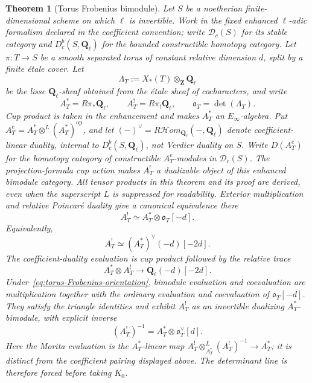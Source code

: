 \documentclass[11pt]{article}
\newtheorem{theorem}{Theorem}[section]
\theoremstyle{definition}
\theoremstyle{remark}
\newcommand{\Qell}{\mathbf Q_\ell}
\begin{document}
\begin{theorem}[Torus Frobenius bimodule]
\label{thm:torus-Frobenius-bimodule}
Let $S$ be a noetherian finite-dimensional scheme on which $\ell$ is
invertible.  Work in the fixed enhanced $\ell$-adic formalism declared in the
coefficient convention; write $\mathscr D_c(S)$ for its stable category and
$D_c^b(S,\Qell)$ for the bounded constructible homotopy category.  Let
$\pi:T\to S$ be a
smooth separated torus of constant relative dimension $d$, split by a finite
\'etale cover.  Let
\[
 \Lambda_T:=X_*(T)\otimes_{\mathbf Z}\Qell
\]
be the lisse $\Qell$-sheaf obtained from the \'etale sheaf of cocharacters,
and write
\[
 A_T^*=R\pi_*\Qell,
 \qquad
 A_T^!=R\pi_!\Qell,
 \qquad
 \mathfrak o_T=\det(\Lambda_T).
\]
Cup product is taken in the enhancement and makes $A_T^*$ an
$E_\infty$-algebra.  Put
$A_T^e=A_T^*\otimes^L(A_T^*)^{\mathrm{op}}$, and let
$(-)^\vee=R\mathcal Hom_{\Qell}(-,\Qell)$ denote coefficient-linear duality,
internal to $D_c^b(S,\Qell)$, not Verdier duality on $S$.  Write
$D(A_T^e)$ for the homotopy category of constructible $A_T^e$-modules in
$\mathscr D_c(S)$.  The projection-formula cup action makes $A_T^!$ a
dualizable object of this enhanced bimodule category.  All tensor products in
this theorem and its proof are derived, even when the
superscript $L$ is suppressed for readability.  Exterior multiplication
and relative Poincar\'e duality give a canonical equivalence there
\begin{equation}
 \boxed{
 A_T^!\simeq A_T^*\otimes\mathfrak o_T[-d].}
 \label{eq:torus-Frobenius-orientation}
\end{equation}
Equivalently,
\begin{equation}
 A_T^!\simeq (A_T^*)^\vee(-d)[-2d].
 \label{eq:torus-compact-ordinary-dual}
\end{equation}
The coefficient-duality evaluation is cup product followed by the relative
trace
\[
 A_T^*\otimes A_T^!\longrightarrow\Qell(-d)[-2d].
\]
Under~\eqref{eq:torus-Frobenius-orientation}, bimodule evaluation and
coevaluation are multiplication together with the ordinary evaluation and
coevaluation of $\mathfrak o_T[-d]$.  They satisfy the triangle identities and
exhibit $A_T^!$ as an invertible dualizing $A_T^*$-bimodule, with explicit
inverse
\begin{equation}
 (A_T^!)^{-1}=A_T^*\otimes\mathfrak o_T^\vee[d].
 \label{eq:torus-Frobenius-inverse}
\end{equation}
Here the Morita evaluation is the $A_T^*$-linear map
$A_T^!\otimes^L_{A_T^*}(A_T^!)^{-1}\to A_T^*$; it is distinct from the
coefficient pairing displayed above.  The determinant line is therefore
forced before taking $K_0$.


\end{theorem}
\end{document}
